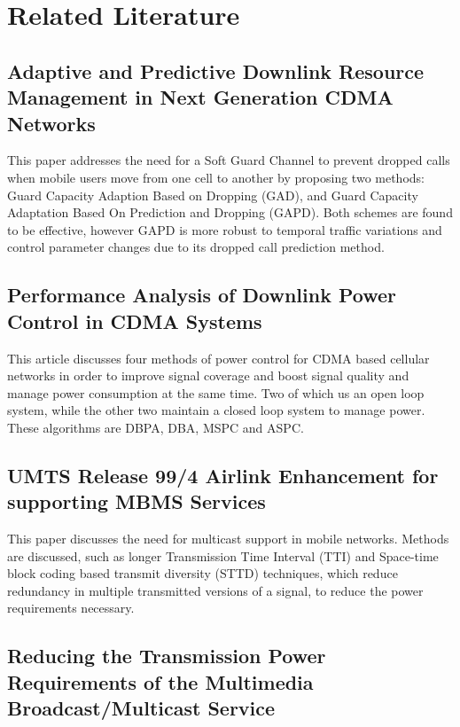 \documentclass[11pt]{article}
\begin{document}
\section{Related Literature}

\subsection{Adaptive and Predictive Downlink Resource Management in Next Generation CDMA Networks}

This paper addresses the need for a Soft Guard Channel to prevent
dropped calls when mobile users move from one cell to another by
proposing two methods: Guard Capacity Adaption Based on Dropping
(GAD), and Guard Capacity Adaptation Based On Prediction and Dropping
(GAPD). Both schemes are found to be effective, however GAPD is more
robust to temporal traffic variations and control parameter changes
due to its dropped call prediction method.

\subsection{Performance Analysis of Downlink Power Control in CDMA Systems}

This article discusses four methods of power control for CDMA based
cellular networks in order to improve signal coverage and boost signal
quality and manage power consumption at the same time. Two of which us
an open loop system, while the other two maintain a closed loop system
to manage power. These algorithms are DBPA, DBA, MSPC and ASPC.

\subsection{UMTS Release 99/4 Airlink Enhancement for supporting MBMS Services}

This paper discusses the need for multicast support in mobile
networks. Methods are discussed, such as longer Transmission Time
Interval (TTI) and Space-time block coding based transmit diversity
(STTD) techniques, which reduce redundancy in multiple transmitted
versions of a signal, to reduce the power requirements necessary.

\subsection{Reducing the Transmission Power Requirements of the Multimedia Broadcast/Multicast Service}
\end{document}
